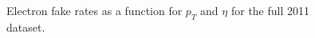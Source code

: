 \begin{figure}[!htbp]
\begin{center}
\caption{Electron fake rates as a function for $p_{T}$ and $\eta$ for the full 2011 dataset.}
\label{fig:ele_fr_Full2011}
\end{center}
\end{figure}


